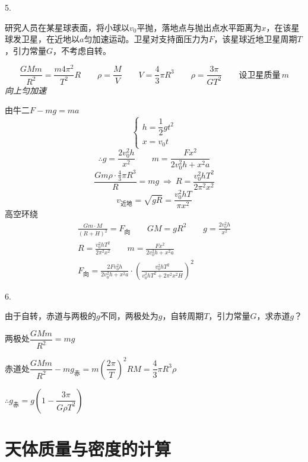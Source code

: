 5.
\begin{problem}
研究人员在某星球表面，将小球以$v_0$平抛，落地点与抛出点水平距离为$x$，在该星球发卫星，在近地以$a$匀加速运动。卫星对支持面压力为$F$，该星球近地卫星周期$T$，引力常量$G$，不考虑自转。 %
\begin{solution}
\[
\frac{GMm}{R^2}=\frac{m4\pi^2}{T^2}R\qquad \rho=\frac{M}{V}\qquad V=\frac43\pi R^3\qquad \rho=\frac{3\pi}{GT^2}\qquad \text{设卫星质量}\,m
\]
\textit{向上匀加速}

由牛二\quad $F-mg=ma$
\[
\begin{cases}
h=\dfrac12gt^2\\[2mm]
x=v_0t
\end{cases}
\]
\[
\therefore g=\frac{2v_0^2h}{x^2}\qquad m=\frac{Fx^2}{2v_0^2h+x^2a}
\]
\[
\frac{Gm\rho\cdot\frac43\pi R^3}{R}=mg\ \Rightarrow\ R=\frac{v_0^2hT^2}{2\pi^2x^2} %
\]
\[
v_{\text{近地}}=\sqrt{gR}=\frac{v_0^2hT}{\pi x^2}
\]
高空环绕
\begin{gather*}
\frac{Gm\cdot M}{(R+H)^2}=F_{\text{向}}\qquad GM=gR^2\qquad g=\frac{2v_0^2h}{x^2}\\
R=\frac{v_0^2hT^2}{2\pi^2x^2}\qquad m=\frac{Fx^2}{2v_0^2h+x^2a}\\
F_{\text{向}}=\frac{2Fv_0^2h}{2v_0^2h+x^2a}\cdot\left(\frac{v_0^2hT^2}{v_0^2hT^2+2\pi^2x^2H}\right)^2
\end{gather*}
\end{solution}
\end{problem}

6.
\begin{problem}
由于自转，赤道与两极的$g$不同，两极处为$g$，自转周期$T$，引力常量$G$，求赤道$g$？
\begin{solution}
两极处\quad $\dfrac{GMm}{R^2}=mg$

赤道处\quad $\dfrac{GMm}{R^2}-mg_{\text{赤}}=m\left(\dfrac{2\pi}{T}\right)^2R$\quad $M=\dfrac43\pi R^3\rho$

$\therefore g_{\text{赤}}=g\left(1-\dfrac{3\pi}{G\rho T^2}\right)$
\end{solution}
\end{problem}


\section{天体质量与密度的计算}

